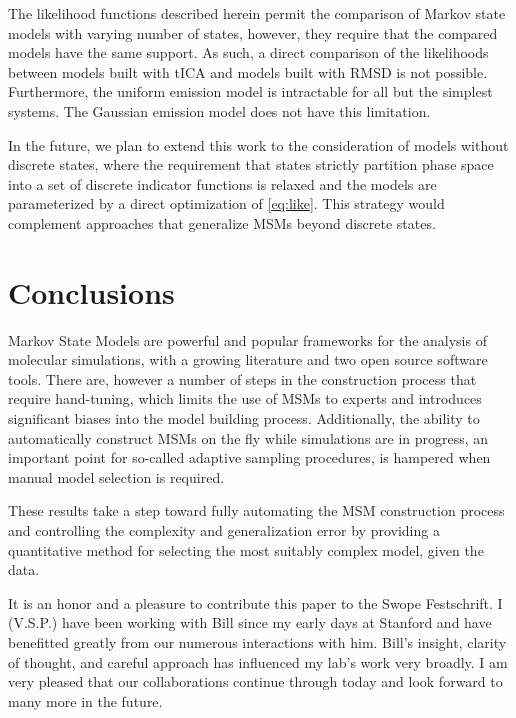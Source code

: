 \documentclass[journal=jpcbfk, layout=traditional, manuscript=article]{achemso}
\begin{document}
The likelihood functions described herein permit the comparison of Markov state models with varying number of states, however, they require that the compared models have the same support. As such, a direct comparison of the likelihoods between models built with tICA and models built with RMSD is not possible. Furthermore, the uniform emission model is intractable for all but the simplest systems. The Gaussian emission model does not have this limitation.

In the future, we plan to extend this work to the consideration of models without discrete states, where the requirement that states strictly partition phase space into a set of discrete indicator functions is relaxed and the models are parameterized by a direct optimization of \cref{eq:like}. This strategy would complement approaches that generalize MSMs beyond discrete states\cite{Noe2013Variational}.

\section{Conclusions}

Markov State Models are powerful and popular frameworks for the analysis of molecular simulations, with a growing literature and two open source software tools\cite{Beauchamp2011Msmbuilder2, Senne2012EMMA}. There are, however a number of steps in the construction process that require hand-tuning, which limits the use of MSMs to experts and introduces significant biases into the model building process. Additionally, the ability to automatically construct MSMs on the fly while simulations are in progress, an important point for so-called adaptive sampling procedures\cite{Bowman2010Enhanced}, is hampered when manual model selection is required. 

These results take a step toward fully automating the MSM construction process and controlling the complexity and generalization error by providing a quantitative method for selecting the most suitably complex model, given the data.

\begin{acknowledgement}
It is an honor and a pleasure to contribute this paper to the Swope Festschrift.  I (V.S.P.) have been working with Bill since my early days at Stanford and have benefitted greatly from our numerous interactions with him.  Bill's insight, clarity of thought, and careful approach has influenced my lab's work very broadly.  I am very pleased that our collaborations continue through today and look forward to many more in the future.
\end{acknowledgement}
\end{document}
